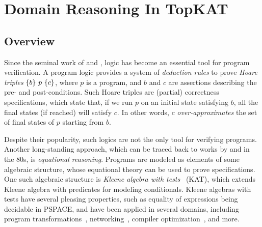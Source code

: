 \chapter{Domain Reasoning In TopKAT}
\label{chapter:TopKAT}
\thispagestyle{myheadings}

\section{Overview}


Since the seminal work of \citet{Floyd67} and \citet{Hoare69}, logic has become
an essential tool for program verification.  A program logic provides a system
of \emph{deduction rules} to prove \emph{Hoare triples} \(\{b\}~p~\{c\}\),
where \(p\) is a program, and \(b\) and \(c\) are assertions describing the pre-
and post-conditions.  Such Hoare triples are (partial) correctness
specifications, which state that, if we run \(p\) on an initial state satisfying
\(b\), all the final states (if reached) will satisfy \(c\). In other words, \(c\)
\emph{over-approximates} the set of final states of \(p\) starting from \(b\).

Despite their popularity, such logics are not the only tool for verifying
programs. Another long-standing approach, which can be traced back to works by
\citet{Taylor79} and \citet{odonnell_1985} in the 80s, is
\emph{equational reasoning}. Programs are modeled as elements of some algebraic
structure, whose equational theory can be used to prove specifications. One such
algebraic structure is \emph{Kleene algebra with tests}~\cite{Kozen_1997}
(KAT), which extends Kleene algebra with predicates for modeling
conditionals. Kleene algebras with tests have several pleasing properties, such
as equality of expressions being decidable in PSPACE, and have been applied in several
domains, including program transformations~\cite{Angus_Kozen_2001}, 
networking~\cite{Anderson_Foster_Guha_Jeannin_Kozen_Schlesinger_Walker_2014,Foster_Kozen_Milano_Silva_Thompson_2015,Smolka_Kumar_Foster_Kozen_Silva,Smolka_Kumar_Kahn_Foster_Hsu_Kozen_Silva_2019}, 
compiler optimization~\cite{Kozen_Patron_2000}, and more.

